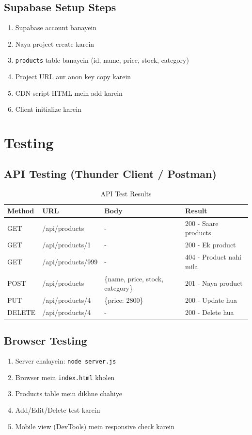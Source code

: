 \documentclass[12pt,a4paper]{article}
\begin{document}
\subsection{Supabase Setup Steps}
\begin{enumerate}[leftmargin=2em]
    \item Supabase account banayein
    \item Naya project create karein
    \item \texttt{products} table banayein (id, name, price, stock, category)
    \item Project URL aur anon key copy karein
    \item CDN script HTML mein add karein
    \item Client initialize karein
\end{enumerate}

\section{Testing}
\label{sec:testing}

\subsection{API Testing (Thunder Client / Postman)}
\begin{table}[H]
\centering
\caption{API Test Results}
\begin{tabular}{@{}llll@{}}
\toprule
\textbf{Method} & \textbf{URL} & \textbf{Body} & \textbf{Result} \\
\midrule
GET & /api/products & - & 200 - Saare products \\
GET & /api/products/1 & - & 200 - Ek product \\
GET & /api/products/999 & - & 404 - Product nahi mila \\
POST & /api/products & \{name, price, stock, category\} & 201 - Naya product \\
PUT & /api/products/4 & \{price: 2800\} & 200 - Update hua \\
DELETE & /api/products/4 & - & 200 - Delete hua \\
\bottomrule
\end{tabular}
\end{table}

\subsection{Browser Testing}
\begin{enumerate}[leftmargin=2em]
    \item Server chalayein: \texttt{node server.js}
    \item Browser mein \texttt{index.html} kholen
    \item Products table mein dikhne chahiye
    \item Add/Edit/Delete test karein
    \item Mobile view (DevTools) mein responsive check karein
\end{enumerate}
\end{document}
